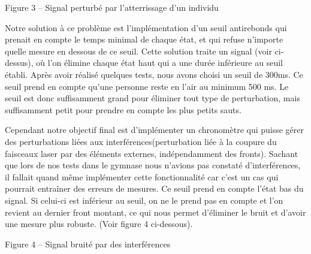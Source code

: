 \begin{center}
  
Figure 3 – Signal perturbé par l’atterrissage d’un individu 
\end{center}

Notre solution à ce problème est l’implémentation d’un seuil antirebonds qui prenait en compte le temps minimal de chaque état, et qui refuse n’importe quelle mesure en dessous de ce seuil. Cette solution traite un signal (voir ci-dessus), où l’on élimine chaque état haut qui a une durée inférieure au seuil établi. Après avoir réalisé quelques tests, nous avons choisi un seuil de 300ms. Ce seuil prend en compte qu’une personne reste en l’air au minimum 500 ms. Le seuil est donc suffisamment grand pour éliminer tout type de perturbation, mais suffisamment petit pour prendre en compte les plus petits sauts.

Cependant notre objectif final est d’implémenter un chronomètre qui puisse gérer des perturbations liées aux interférences(perturbation liée à la coupure du faisceaux laser par des éléments externes, indépendamment des fronts). Sachant que lors de nos tests dans le gymnase nous n'avions pas constaté d’interférences, il fallait quand même implémenter cette fonctionnalité car c'est un cas qui pourrait entraîner des erreurs de mesures. Ce seuil prend en compte l’état bas du signal. Si celui-ci est inférieur au seuil, on ne le prend pas en compte et l'on revient au dernier front montant, ce qui nous permet d’éliminer le bruit et d'avoir une mesure plus robuste. (Voir figure 4 ci-dessous).

\begin{center}
      
    Figure 4 – Signal bruité par des interférences
\end{center}

